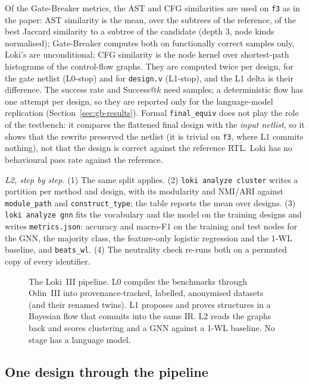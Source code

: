 \documentclass[conference]{IEEEtran}
\newcommand{\code}[1]{\texttt{#1}}
\begin{document}
Of the Gate-Breaker metrics, the AST and CFG similarities are used on \code{f3} as in the
paper: AST similarity is the mean, over the subtrees of the reference, of the best Jaccard
similarity to a subtree of the candidate (depth 3, node kinds normalised); Gate-Breaker computes
both on functionally correct samples only, Loki's are unconditional; CFG
similarity is the node kernel over shortest-path histograms of the control-flow graphs. They
are computed twice per design, for the gate netlist (L0-stop) and for \code{design.v} (L1-stop),
and the L1 delta is their difference. The success rate and Success@$k$ need samples; a
deterministic flow has one attempt per design, so they are reported only for the language-model
replication (Section~\ref{sec:gb-results}). Formal \code{final\_equiv} does not play the role
of the testbench: it compares the flattened final design with the \emph{input netlist}, so it
shows that the rewrite preserved the netlist (it is trivial on \code{f3}, where L1 commits
nothing), not that the design is correct against the reference RTL. Loki has no behavioural
pass rate against the reference.

\emph{L2, step by step.} (1) The same split applies. (2) \code{loki analyze cluster} writes
a partition per method and design, with its modularity and NMI/ARI against \code{module\_path}
and \code{construct\_type}; the table reports the mean over designs. (3) \code{loki analyze
gnn} fits the vocabulary and the model on the training designs and writes \code{metrics.json}:
accuracy and macro-F1 on the training and test nodes for the GNN, the majority class, the
feature-only logistic regression and the 1-WL baseline, and \code{beats\_wl}. (4) The
neutrality check re-runs both on a permuted copy of every identifier.

\begin{figure}[t]
\centering
\odinfit{\columnwidth}{}
\caption{The Loki~III pipeline. L0 compiles the benchmarks through Odin~III into provenance-tracked, labelled, anonymised datasets (and their renamed twins). L1 proposes and proves structures in a Bayesian flow that commits into the same IR. L2 reads the graphs back and scores clustering and a GNN against a 1-WL baseline. No stage has a language model.}
\label{fig:loki}
\end{figure}

\subsection{One design through the pipeline}
\label{sec:walk}
\end{document}
